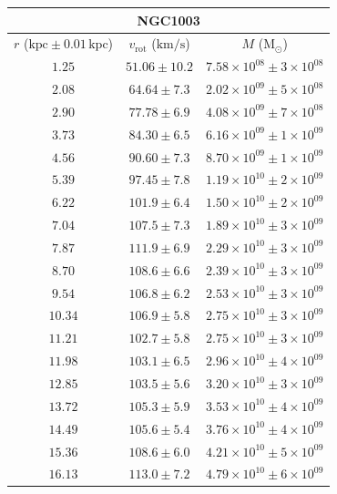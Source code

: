 \documentclass{article}
\newcommand\solmass{\textrm{M}_\odot}
\newcommand\kpc{\textrm{kpc}}
\newcommand\kmps{\textrm{km}/\textrm{s}}
\newcommand\vrot{\ensuremath{v_{\textrm{rot}}}}
\begin{document}
\begin{table}[h!]
    \begin{tabular}{|c|c|c|}
        \hline
        \multicolumn{3}{|c|}{NGC1003} \\
        \hline
        $r$ ($\kpc \pm 0.01 \,\kpc$) & $\vrot$ ($\kmps$) & $M$ ($\solmass$) \\
        \hline
        $1.25$ & $51.06 \pm 10.2$ & $7.58\times 10^{08} \pm 3\times 10^{08}$ \\
        $2.08$ & $64.64 \pm 7.3$ & $2.02\times 10^{09} \pm 5\times 10^{08}$ \\
        $2.90$ & $77.78 \pm 6.9$ & $4.08\times 10^{09} \pm 7\times 10^{08}$ \\
        $3.73$ & $84.30 \pm 6.5$ & $6.16\times 10^{09} \pm 1\times 10^{09}$ \\
        $4.56$ & $90.60 \pm 7.3$ & $8.70\times 10^{09} \pm 1\times 10^{09}$ \\
        $5.39$ & $97.45 \pm 7.8$ & $1.19\times 10^{10} \pm 2\times 10^{09}$ \\
        $6.22$ & $101.9 \pm 6.4$ & $1.50\times 10^{10} \pm 2\times 10^{09}$ \\
        $7.04$ & $107.5 \pm 7.3$ & $1.89\times 10^{10} \pm 3\times 10^{09}$ \\
        $7.87$ & $111.9 \pm 6.9$ & $2.29\times 10^{10} \pm 3\times 10^{09}$ \\
        $8.70$ & $108.6 \pm 6.6$ & $2.39\times 10^{10} \pm 3\times 10^{09}$ \\
        $9.54$ & $106.8 \pm 6.2$ & $2.53\times 10^{10} \pm 3\times 10^{09}$ \\
        $10.34$ & $106.9 \pm 5.8$ & $2.75\times 10^{10} \pm 3\times 10^{09}$ \\
        $11.21$ & $102.7 \pm 5.8$ & $2.75\times 10^{10} \pm 3\times 10^{09}$ \\
        $11.98$ & $103.1 \pm 6.5$ & $2.96\times 10^{10} \pm 4\times 10^{09}$ \\
        $12.85$ & $103.5 \pm 5.6$ & $3.20\times 10^{10} \pm 3\times 10^{09}$ \\
        $13.72$ & $105.3 \pm 5.9$ & $3.53\times 10^{10} \pm 4\times 10^{09}$ \\
        $14.49$ & $105.6 \pm 5.4$ & $3.76\times 10^{10} \pm 4\times 10^{09}$ \\
        $15.36$ & $108.6 \pm 6.0$ & $4.21\times 10^{10} \pm 5\times 10^{09}$ \\
        $16.13$ & $113.0 \pm 7.2$ & $4.79\times 10^{10} \pm 6\times 10^{09}$ \\

\end{tabular}
\end{table}
\end{document}
